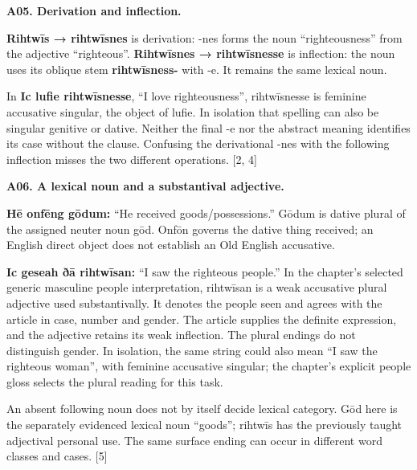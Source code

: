 \par\begin{minipage}{\linewidth}\raggedright
\textbf{A05. Derivation and inflection.}

\textbf{Rihtwīs → rihtwīsnes} is derivation: -nes forms the noun “righteousness” from the adjective “righteous”. \textbf{Rihtwīsnes → rihtwīsnesse} is inflection: the noun uses its oblique stem \textbf{rihtwīsness-} with -e. It remains the same lexical noun.

In \textbf{Ic lufie rihtwīsnesse}, “I love righteousness”, rihtwīsnesse is feminine accusative singular, the object of lufie. In isolation that spelling can also be singular genitive or dative. Neither the final -e nor the abstract meaning identifies its case without the clause. Confusing the derivational -nes with the following inflection misses the two different operations. [2, 4]

\end{minipage}\par\addvspace{4pt}

\par\begin{minipage}{\linewidth}\raggedright
\textbf{A06. A lexical noun and a substantival adjective.}

\textbf{Hē onfēng gōdum:} “He received goods/\allowbreak{}possessions.” Gōdum is dative plural of the assigned neuter noun gōd. Onfōn governs the dative thing received; an English direct object does not establish an Old English accusative.

\textbf{Ic geseah ðā rihtwīsan:} “I saw the righteous people.” In the chapter's selected generic masculine people interpretation, rihtwīsan is a weak accusative plural adjective used substantivally. It denotes the people seen and agrees with the article in case, number and gender. The article supplies the definite expression, and the adjective retains its weak inflection. The plural endings do not distinguish gender. In isolation, the same string could also mean “I saw the righteous woman”, with feminine accusative singular; the chapter's explicit people gloss selects the plural reading for this task.

An absent following noun does not by itself decide lexical category. Gōd here is the separately evidenced lexical noun “goods”; rihtwīs has the previously taught adjectival personal use. The same surface ending can occur in different word classes and cases. [5]

\end{minipage}\par\addvspace{4pt}

